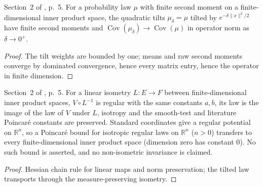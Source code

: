 \begin{lemma}
  \label{lem:bkl-quadratic-covariance}
  \leanok
  Section~2 of \cite{BizeulKlartagLehec2026}, p.~5. For a probability law $\mu$ with finite second
  moment on a finite-dimensional inner product space, the quadratic tilts
  $\mu_\delta=\mu$ tilted by $e^{-\delta\|x\|^2/2}$ have finite second moments and
  $\operatorname{Cov}(\mu_\delta)\to\operatorname{Cov}(\mu)$ in operator norm as $\delta\to0^+$.
\end{lemma}
\begin{proof}
  \leanok
  The tilt weights are bounded by one; means and raw second moments converge by dominated
  convergence, hence every matrix entry, hence the operator in finite dimension.
\end{proof}

\begin{lemma}
  \label{lem:bkl-regular-isometry}
  \leanok
  Section~2 of \cite{BizeulKlartagLehec2026}, p.~5. For a linear isometry $L:E\to F$ between
  finite-dimensional inner product spaces, $V\circ L^{-1}$ is regular with the same constants
  $a,b$, its law is the image of the law of $V$ under $L$, isotropy and the smooth-test and
  literature Poincaré constants are preserved. Standard coordinates give a regular potential on
  $\mathbb R^n$, so a Poincaré bound for isotropic regular laws on $\mathbb R^n$ ($n>0$) transfers
  to every finite-dimensional inner product space (dimension zero has constant $0$). No such
  bound is asserted, and no non-isometric invariance is claimed.
\end{lemma}
\begin{proof}
  \leanok
  Hessian chain rule for linear maps and norm preservation; the tilted law transports through
  the measure-preserving isometry.
\end{proof}

